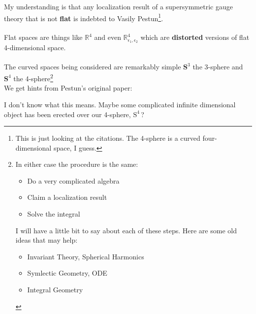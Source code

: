 \documentclass[12pt]{article}
\begin{document}
\noindent My understanding is that any localization result of a supersymmetric gauge theory that is not \textbf{flat} is indebted to Vasily Pestun\footnote{This is just looking at the citations.  The 4-sphere is a curved four-dimensional space, I guess.}.   \\ \\
Flat spaces are things like $\mathbb{R}^4$ and even $\mathbb{R}^4_{\epsilon_1, \epsilon_2}$ which are \textbf{distorted} versions of flat 4-dimensional space.  \\ \\
The curved spaces being considered are remarkably simple $\textbf{S}^3$ the 3-sphere and $\textbf{S}^4$ the 4-sphere\footnote{  In either case the procedure is the same:
\begin{itemize}
\item Do a very complicated algebra
\item Claim a localization result
\item Solve the integral
\end{itemize}
I will have a little bit to say about each of these steps.  Here are some old ideas that may help:
\begin{itemize}
\item Invariant Theory, Spherical Harmonics
\item Symlectic Geometry, ODE 
\item Integral Geometry
\end{itemize}}
\\

\noindent We get hints from Pestun's original paper:
\begin{quotation}
\noindent {\color{blue}{equivariant Euler class of the infinite-dimensional normal
bundle to the localization locus}}
\end{quotation}
I don't know what this means.   Maybe some complicated infinite dimensional object has been erected over our 4-sphere, $\text{S}^4$\,?
\newpage
\end{document}
